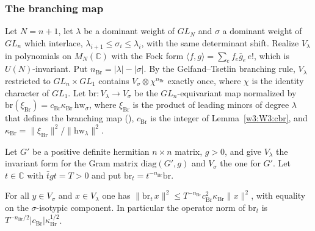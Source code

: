 \subsubsection{The branching map}

Let $N=n+1$, let $\lambda$ be a dominant weight of $GL_N$ and $\sigma$ a dominant weight of $GL_n$ which interlace, $\lambda_{i+1}\le\sigma_i\le\lambda_i$, with the same determinant shift. Realize $V_\lambda$ in polynomials on $M_N(\mathbb C)$ with the Fock form $\langle f,g\rangle=\sum_ef_e\bar g_e\,e!$, which is $U(N)$-invariant. Put $n_{\mathrm{Br}}=\lvert\lambda\rvert-\lvert\sigma\rvert$. By the Gelfand--Tsetlin branching rule, $V_\lambda$ restricted to $GL_n\times GL_1$ contains $V_\sigma\otimes\chi^{n_{\mathrm{Br}}}$ exactly once, where $\chi$ is the identity character of $GL_1$. Let $\mathrm{br}\colon V_\lambda\to V_\sigma$ be the $GL_n$-equivariant map normalized by $\mathrm{br}(\xi_{\mathrm{Br}})=c_{\mathrm{Br}}\kappa_{\mathrm{Br}}\,\mathrm{hw}_\sigma$, where $\xi_{\mathrm{Br}}$ is the product of leading minors of degree $\lambda$ that defines the branching map (), $c_{\mathrm{Br}}$ is the integer of Lemma~\ref{w3:W3:cbr}, and $\kappa_{\mathrm{Br}}=\lVert\xi_{\mathrm{Br}}\rVert^2/\lVert\mathrm{hw}_\lambda\rVert^2$.

Let $G'$ be a positive definite hermitian $n\times n$ matrix, $g>0$, and give $V_\lambda$ the invariant form for the Gram matrix $\mathrm{diag}(G',g)$ and $V_\sigma$ the one for $G'$. Let $t\in\mathbb C$ with $\bar tgt=T>0$ and put $\mathrm{br}_t=t^{-n_{\mathrm{Br}}}\mathrm{br}$.

\begin{proposition}\label{w3:W3:br}
For all $y\in V_\sigma$ and $x\in V_\lambda$ one has $\lVert\mathrm{br}_t\,x\rVert^2\le T^{-n_{\mathrm{Br}}}c_{\mathrm{Br}}^2\kappa_{\mathrm{Br}}\lVert x\rVert^2$, with equality on the $\sigma$-isotypic component. In particular the operator norm of $\mathrm{br}_t$ is $T^{-n_{\mathrm{Br}}/2}\lvert c_{\mathrm{Br}}\rvert\kappa_{\mathrm{Br}}^{1/2}$.
\end{proposition}

